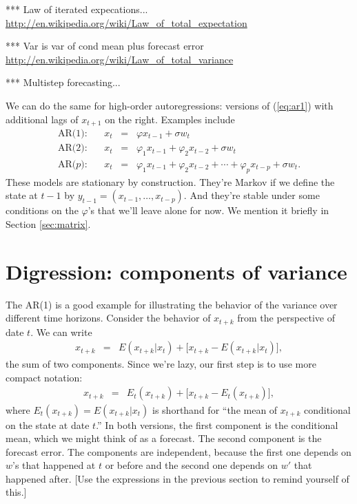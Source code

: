 \documentclass[11pt]{article}
\begin{document}
*** Law of iterated expecations... \\
\url{http://en.wikipedia.org/wiki/Law_of_total_expectation}

*** Var is var of cond mean plus forecast error \\
\url{http://en.wikipedia.org/wiki/Law_of_total_variance}

*** Multistep forecasting...

We can do the same for high-order autoregressions:
versions of (\ref{eq:ar1}) with additional lags of $x_{t+1}$ on the right.
Examples include
\begin{eqnarray*}
    \mbox{AR(1)}:     &&  x_t \;\;=\;\; \varphi x_{t-1} + \sigma w_t  \\
    \mbox{AR($2$)}:   &&  x_t \;\;=\;\; \varphi_1 x_{t-1} + \varphi_2 x_{t-2}
                    +\sigma w_t  \\
    \mbox{AR($p$)}:   &&  x_t \;\;=\;\; \varphi_1 x_{t-1} + \varphi_2 x_{t-2}
                    + \cdots + \varphi_p x_{t-p} + \sigma w_t   .
\end{eqnarray*}
These models are stationary by construction.
They're Markov if we define the state at $t-1$ by
$ y_{t-1} = (x_{t-1}, \ldots, x_{t-p})$.
And they're stable under some conditions on the $\varphi$'s that we'll leave alone
for now.
We mention it briefly in Section \ref{sec:matrix}.


\section{Digression: components of variance}

The AR(1) is a good example for illustrating the behavior of the variance
over different time horizons.
Consider the behavior of $x_{t+k}$ from the perspective of date $t$.
We can write
\begin{eqnarray*}
    x_{t+k} &=& E (x_{t+k} | x_t ) + \big[ x_{t+k} - E (x_{t+k} | x_t )\big] ,
\end{eqnarray*}
the sum of two components.
Since we're lazy, our first step is to use more compact notation:
\begin{eqnarray*}
    x_{t+k} &=& E_t (x_{t+k}) + \big[ x_{t+k} - E_t (x_{t+k})\big] ,
\end{eqnarray*}
where $ E_t (x_{t+k}) = E (x_{t+k} | x_t )$ is shorthand for
``the mean of $x_{t+k}$ conditional on the state at date $t$.''
In both versions, the first component is the conditional mean,
which we might think of as a forecast.
The second component is the forecast error.
The components are independent,
because the first one depends on $w$'s that happened at $t$ or before
and the second one depends on $w'$ that happened after.
[Use the expressions in the previous section to remind yourself of this.]
\end{document}
